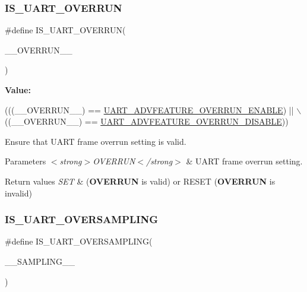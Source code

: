 \subsubsection{\texorpdfstring{I\+S\+\_\+\+U\+A\+R\+T\+\_\+\+O\+V\+E\+R\+R\+UN}{IS\_UART\_OVERRUN}}
{\footnotesize\ttfamily \#define I\+S\+\_\+\+U\+A\+R\+T\+\_\+\+O\+V\+E\+R\+R\+UN(\begin{DoxyParamCaption}\item[{}]{\+\_\+\+\_\+\+O\+V\+E\+R\+R\+U\+N\+\_\+\+\_\+ }\end{DoxyParamCaption})}

{\bfseries Value\+:}
\begin{DoxyCode}
(((\_\_OVERRUN\_\_) == \hyperlink{group___u_a_r_t___overrun___disable_gac467cc43fa4c3af4acb0fd161061c219}{UART\_ADVFEATURE\_OVERRUN\_ENABLE}) || \(\backslash\)
                                          ((\_\_OVERRUN\_\_) == 
      \hyperlink{group___u_a_r_t___overrun___disable_ga19961cd52b746dac7a6860faad2ab40d}{UART\_ADVFEATURE\_OVERRUN\_DISABLE}))
\end{DoxyCode}


Ensure that U\+A\+RT frame overrun setting is valid. 


\begin{DoxyParams}{Parameters}
{\em $<$strong$>$\+O\+V\+E\+R\+R\+U\+N$<$/strong$>$} & U\+A\+RT frame overrun setting. \\
\hline
\end{DoxyParams}

\begin{DoxyRetVals}{Return values}
{\em S\+ET} & ({\bfseries O\+V\+E\+R\+R\+UN} is valid) or R\+E\+S\+ET ({\bfseries O\+V\+E\+R\+R\+UN} is invalid) \\
\hline
\end{DoxyRetVals}
\mbox{\label{group___u_a_r_t___private___macros_ga8d918253e015c4a8aa07316a89f8265e}} 
\subsubsection{\texorpdfstring{I\+S\+\_\+\+U\+A\+R\+T\+\_\+\+O\+V\+E\+R\+S\+A\+M\+P\+L\+I\+NG}{IS\_UART\_OVERSAMPLING}}
{\footnotesize\ttfamily \#define I\+S\+\_\+\+U\+A\+R\+T\+\_\+\+O\+V\+E\+R\+S\+A\+M\+P\+L\+I\+NG(\begin{DoxyParamCaption}\item[{}]{\+\_\+\+\_\+\+S\+A\+M\+P\+L\+I\+N\+G\+\_\+\+\_\+ }\end{DoxyParamCaption})}

